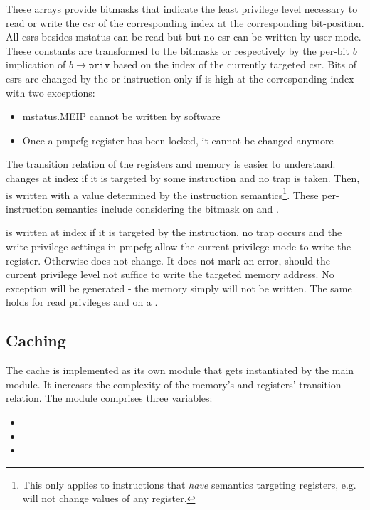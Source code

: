 These arrays provide bitmasks that indicate the least privilege level necessary to read or write the \gls{csr} of the corresponding index at the corresponding bit-position.
All \glspl{csr} besides \gls{mstatus} can be read but but no \gls{csr} can be written by user-mode.
These constants are transformed to the bitmasks  or  respectively by the per-bit $ b $ implication of $ b \rightarrow \texttt{priv} $ based on the index of the currently targeted \gls{csr}.
Bits of \glspl{csr} are changed by the  or  instruction only if  is high at the corresponding index with two exceptions:
\begin{itemize}
    \item \gls{mstatus}.MEIP cannot be written by software
    \item Once a \gls{pmpcfg} register has been locked, it cannot be changed anymore
\end{itemize}

The transition relation of the registers and memory is easier to understand.
 changes at index  if it is targeted by some instruction and no trap is taken.
Then,  is written with a value determined by the instruction semantics\footnote{%
    This only applies to instructions that \textit{have} semantics targeting registers, e.g.  will not change values of any register.
}.
These per-instruction semantics include considering the  bitmask on  and .

 is written at index  if it is targeted by the  instruction, no trap occurs and the write privilege settings in \gls{pmpcfg} allow the current privilege mode to write the register.
Otherwise  does not change.
It does not mark an error, should the current privilege level not suffice to write the targeted memory address.
No exception will be generated - the memory simply will not be written.
The same holds for read privileges and  on a .

\subsection{Caching}
\label{sec:implementation-caching}

The cache is implemented as its own module that gets instantiated by the main module.
It increases the complexity of the memory's and registers' transition relation.
The module comprises three variables:
\begin{itemize}
    \item {}
    \item {}
    \item {}
\end{itemize}

